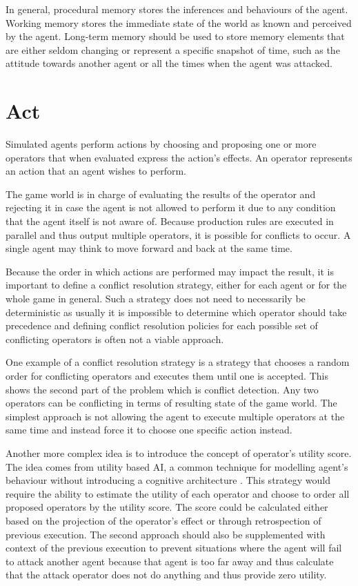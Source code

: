 In general, procedural memory stores the inferences and behaviours of the agent.
Working memory stores the immediate state of the world as known and perceived by the agent.
Long-term memory should be used to store memory elements that are either seldom changing or represent a specific snapshot of time, such as the attitude towards another agent or all the times when the agent was attacked.

\section{Act}

Simulated agents perform actions by choosing and proposing one or more operators that when evaluated express the action's effects.
An operator represents an action that an agent wishes to perform.

The game world is in charge of evaluating the results of the operator and rejecting it in case the agent is not allowed to perform it due to any condition that the agent itself is not aware of.
Because production rules are executed in parallel and thus output multiple operators, it is possible for conflicts to occur.
A single agent may think to move forward and back at the same time.

Because the order in which actions are performed may impact the result, it is important to define a conflict resolution strategy, either for each agent or for the whole game in general.
Such a strategy does not need to necessarily be deterministic as usually it is impossible to determine which operator should take precedence and defining conflict resolution policies for each possible set of conflicting operators is often not a viable approach.

One example of a conflict resolution strategy is a strategy that chooses a random order for conflicting operators and executes them until one is accepted.
This shows the second part of the problem which is conflict detection.
Any two operators can be conflicting in terms of resulting state of the game world.
The simplest approach is not allowing the agent to execute multiple operators at the same time and instead force it to choose one specific action instead.

Another more complex idea is to introduce the concept of operator's utility score.
The idea comes from utility based AI, a common technique for modelling agent's behaviour without introducing a cognitive architecture \cite{dill2012design}.
This strategy would require the ability to estimate the utility of each operator and choose to order all proposed operators by the utility score.
The score could be calculated either based on the projection of the operator's effect or through retrospection of previous execution.
The second approach should also be supplemented with context of the previous execution to prevent situations where the agent will fail to attack another agent because that agent is too far away and thus calculate that the attack operator does not do anything and thus provide zero utility.

